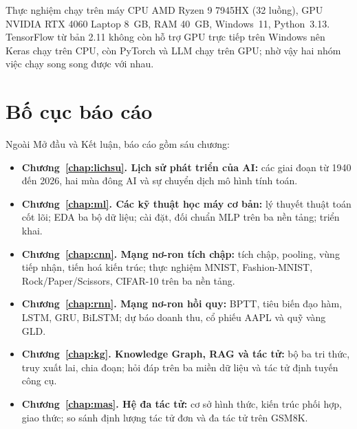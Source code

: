 Thực nghiệm chạy trên máy CPU AMD Ryzen 9 7945HX (32 luồng), GPU NVIDIA RTX 4060 Laptop 8~GB, RAM 40~GB, Windows~11, Python~3.13.
TensorFlow từ bản 2.11 không còn hỗ trợ GPU trực tiếp trên Windows nên Keras chạy trên CPU, còn PyTorch và LLM chạy trên GPU; nhờ
vậy hai nhóm việc chạy song song được với nhau.

\section*{Bố cục báo cáo}
Ngoài Mở đầu và Kết luận, báo cáo gồm sáu chương:

\begin{itemize}
  \item \textbf{Chương~\ref{chap:lichsu}. Lịch sử phát triển của AI:} các giai đoạn từ 1940 đến 2026, hai mùa đông AI và sự chuyển
        dịch mô hình tính toán.
  \item \textbf{Chương~\ref{chap:ml}. Các kỹ thuật học máy cơ bản:} lý thuyết thuật toán cốt lõi; EDA ba bộ dữ liệu; cài đặt, đối
        chuẩn MLP trên ba nền tảng; triển khai.
  \item \textbf{Chương~\ref{chap:cnn}. Mạng nơ-ron tích chập:} tích chập, pooling, vùng tiếp nhận, tiến hoá kiến trúc; thực nghiệm
        MNIST, Fashion-MNIST, Rock/Paper/Scissors, CIFAR-10 trên ba nền tảng.
  \item \textbf{Chương~\ref{chap:rnn}. Mạng nơ-ron hồi quy:} BPTT, tiêu biến đạo hàm, LSTM, GRU, BiLSTM; dự báo doanh thu, cổ
        phiếu AAPL và quỹ vàng GLD.
  \item \textbf{Chương~\ref{chap:kg}. Knowledge Graph, RAG và tác tử:} bộ ba tri thức, truy xuất lai, chia đoạn; hỏi đáp trên ba
        miền dữ liệu và tác tử định tuyến công cụ.
  \item \textbf{Chương~\ref{chap:mas}. Hệ đa tác tử:} cơ sở hình thức, kiến trúc phối hợp, giao thức; so sánh định lượng tác tử
        đơn và đa tác tử trên GSM8K.
\end{itemize}
